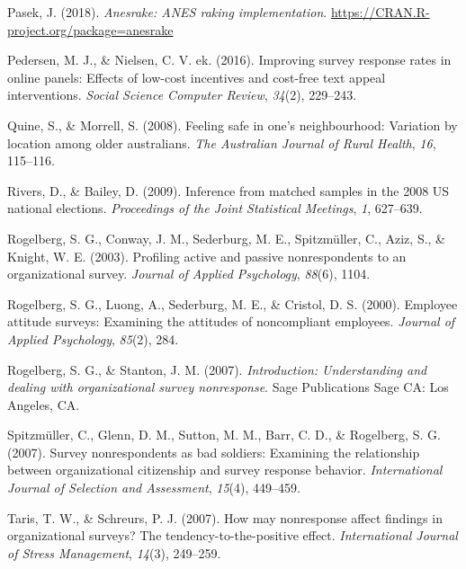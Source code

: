 \documentclass[
  man,mask]{apa7}
\newlength{\cslhangindent}
\newenvironment{CSLReferences}[2] %
 {\begin{list}{}{%
  \setlength{\itemindent}{0pt}
  \setlength{\leftmargin}{0pt}
  \setlength{\parsep}{0pt}
  \ifodd #1
   \setlength{\leftmargin}{\cslhangindent}
   \setlength{\itemindent}{-1\cslhangindent}
  \fi
  \setlength{\itemsep}{#2\baselineskip}}}
 {\end{list}}
\begin{document}
\begin{CSLReferences}{1}{0}
Pasek, J. (2018). \emph{Anesrake: ANES raking implementation}. \url{https://CRAN.R-project.org/package=anesrake}

Pedersen, M. J., \& Nielsen, C. V. ek. (2016). Improving survey response rates in online panels: Effects of low-cost incentives and cost-free text appeal interventions. \emph{Social Science Computer Review}, \emph{34}(2), 229--243.

Quine, S., \& Morrell, S. (2008). Feeling safe in one's neighbourhood: Variation by location among older australians. \emph{The Australian Journal of Rural Health}, \emph{16}, 115--116.

Rivers, D., \& Bailey, D. (2009). Inference from matched samples in the 2008 {US} national elections. \emph{Proceedings of the Joint Statistical Meetings}, \emph{1}, 627--639.

Rogelberg, S. G., Conway, J. M., Sederburg, M. E., Spitzmüller, C., Aziz, S., \& Knight, W. E. (2003). Profiling active and passive nonrespondents to an organizational survey. \emph{Journal of Applied Psychology}, \emph{88}(6), 1104.

Rogelberg, S. G., Luong, A., Sederburg, M. E., \& Cristol, D. S. (2000). Employee attitude surveys: Examining the attitudes of noncompliant employees. \emph{Journal of Applied Psychology}, \emph{85}(2), 284.

Rogelberg, S. G., \& Stanton, J. M. (2007). \emph{Introduction: Understanding and dealing with organizational survey nonresponse}. Sage Publications Sage {CA}: Los Angeles, {CA}.

Spitzmüller, C., Glenn, D. M., Sutton, M. M., Barr, C. D., \& Rogelberg, S. G. (2007). Survey nonrespondents as bad soldiers: Examining the relationship between organizational citizenship and survey response behavior. \emph{International Journal of Selection and Assessment}, \emph{15}(4), 449--459.

Taris, T. W., \& Schreurs, P. J. (2007). How may nonresponse affect findings in organizational surveys? The tendency-to-the-positive effect. \emph{International Journal of Stress Management}, \emph{14}(3), 249--259.


\end{CSLReferences}
\end{document}
